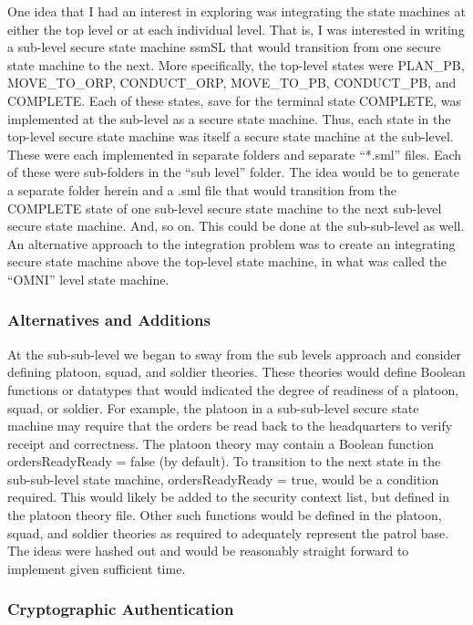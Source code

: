 One idea that I had an interest in exploring was integrating the
state machines at either the top level or at each individual level.
That is, I was interested in writing a sub-level secure state machine
ssmSL that would transition from one secure state machine to the next.
More specifically, the top-level states were PLAN_PB, MOVE_TO_ORP,
CONDUCT_ORP, MOVE_TO_PB, CONDUCT_PB, and COMPLETE. Each of these states,
save for the terminal state COMPLETE, was implemented at the sub-level
as a secure state machine. Thus, each state in the top-level secure state
machine was itself a secure state machine at the sub-level. These were
each implemented in separate folders and separate “*.sml” files. Each
of these were sub-folders in the “sub level” folder. The idea would be
to generate a separate folder herein and a .sml file that would transition
from the COMPLETE state of one sub-level secure state machine to the
next sub-level secure state machine. And, so on. This could be done at
the sub-sub-level as well. An alternative approach to the integration
problem was to create an integrating secure state machine above the
top-level state machine, in what was called the “OMNI” level state machine.

\subsubsection{Alternatives and Additions}
\label{sec:altern-addit}

At the sub-sub-level we began to sway from the sub levels approach
and consider defining platoon, squad, and soldier theories. These
theories would define Boolean functions or datatypes that would
indicated the degree of readiness of a platoon, squad, or soldier.
For example, the platoon in a sub-sub-level secure state machine
may require that the orders be read back to the headquarters to verify
receipt and correctness. The platoon theory may contain a Boolean
function ordersReadyReady = false (by default). To transition to the
next state in the sub-sub-level state machine, ordersReadyReady = true, would be a condition required. This
would likely be added to the security context list, but defined in the
platoon theory file. Other such functions would be defined in the
platoon, squad, and soldier theories as required to adequately represent
the patrol base. The ideas were hashed out and would be reasonably
straight forward to implement given sufficient time.

\subsubsection{Cryptographic Authentication}
\label{sec:crypt-auth}

